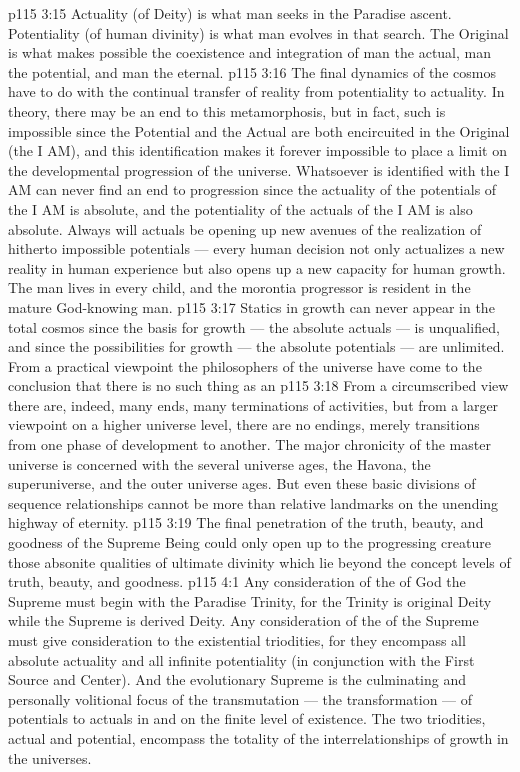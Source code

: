\vs p115 3:15 Actuality (of Deity) is what man seeks in the Paradise ascent. Potentiality (of human divinity) is what man evolves in that search. The Original is what makes possible the coexistence and integration of man the actual, man the potential, and man the eternal.
\vs p115 3:16 \pc The final dynamics of the cosmos have to do with the continual transfer of reality from potentiality to actuality. In theory, there may be an end to this metamorphosis, but in fact, such is impossible since the Potential and the Actual are both encircuited in the Original (the I AM), and this identification makes it forever impossible to place a limit on the developmental progression of the universe. Whatsoever is identified with the I AM can never find an end to progression since the actuality of the potentials of the I AM is absolute, and the potentiality of the actuals of the I AM is also absolute. Always will actuals be opening up new avenues of the realization of hitherto impossible potentials --- every human decision not only actualizes a new reality in human experience but also opens up a new capacity for human growth. The man lives in every child, and the morontia progressor is resident in the mature God\hyp{}knowing man.
\vs p115 3:17 Statics in growth can never appear in the total cosmos since the basis for growth --- the absolute actuals --- is unqualified, and since the possibilities for growth --- the absolute potentials --- are unlimited. From a practical viewpoint the philosophers of the universe have come to the conclusion that there is no such thing as an 
\vs p115 3:18 From a circumscribed view there are, indeed, many ends, many terminations of activities, but from a larger viewpoint on a higher universe level, there are no endings, merely transitions from one phase of development to another. The major chronicity of the master universe is concerned with the several universe ages, the Havona, the superuniverse, and the outer universe ages. But even these basic divisions of sequence relationships cannot be more than relative landmarks on the unending highway of eternity.
\vs p115 3:19 The final penetration of the truth, beauty, and goodness of the Supreme Being could only open up to the progressing creature those absonite qualities of ultimate divinity which lie beyond the concept levels of truth, beauty, and goodness.
\vs p115 4:1 Any consideration of the  of God the Supreme must begin with the Paradise Trinity, for the Trinity is original Deity while the Supreme is derived Deity. Any consideration of the  of the Supreme must give consideration to the existential triodities, for they encompass all absolute actuality and all infinite potentiality (in conjunction with the First Source and Center). And the evolutionary Supreme is the culminating and personally volitional focus of the transmutation --- the transformation --- of potentials to actuals in and on the finite level of existence. The two triodities, actual and potential, encompass the totality of the interrelationships of growth in the universes.
